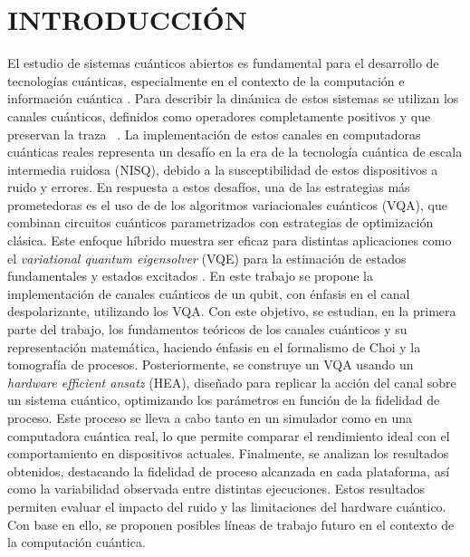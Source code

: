 \documentclass[letterpaper,12pt]{thesisECFM}
\theoremstyle{plain}
\theoremstyle{definition}
\theoremstyle{definition}
\theoremstyle{remark}
\newcommand{\1}{\mathbb{1}}
\begin{document}
\chapter*{INTRODUCCIÓN} %
El estudio de sistemas cuánticos abiertos es fundamental para el desarrollo de
tecnologías cuánticas, especialmente en el contexto de la computación e
información cuántica \cite{nielsen_chuang_2011, schlosshauer2007decoherence}.
Para describir la dinámica de estos sistemas se utilizan los canales cuánticos, definidos como operadores completamente positivos y que preservan la traza  ~\cite{Choi2024}. La implementación de estos canales en computadoras cuánticas reales representa un desafío en la era de la tecnología cuántica de escala intermedia ruidosa (NISQ), debido a la susceptibilidad de estos dispositivos a ruido y errores. 
En respuesta a estos desafíos, una de las estrategias más
prometedoras es el uso de de los algoritmos variacionales cuánticos (VQA),
que combinan circuitos cuánticos parametrizados con estrategias
de optimización clásica. Este enfoque híbrido muestra ser eficaz para
distintas aplicaciones como el \textit{variational quantum eigensolver} (VQE)
para la estimación de estados fundamentales y estados excitados
\cite{VQA}. En este trabajo se propone la implementación de canales
cuánticos de un qubit, con énfasis en el canal despolarizante, utilizando los
VQA. Con este objetivo, se estudian, en la primera parte del trabajo, los
fundamentos teóricos de los canales cuánticos y su representación matemática,
haciendo énfasis en el formalismo de Choi y la tomografía de procesos.
Posteriormente, se construye un VQA usando un \textit{hardware efficient
ansatz} (HEA), diseñado para replicar la acción del canal sobre un sistema
cuántico, optimizando los parámetros en función de la fidelidad de proceso.
Este proceso se lleva a cabo tanto en un simulador como en una computadora
cuántica real, lo que permite comparar el rendimiento ideal con el
comportamiento en dispositivos actuales. Finalmente, se analizan los
resultados obtenidos, destacando la fidelidad de proceso
alcanzada en cada plataforma, así como la variabilidad observada entre
distintas ejecuciones. Estos resultados permiten evaluar el impacto del ruido
y las limitaciones del hardware cuántico. Con base en ello, se proponen
posibles líneas de trabajo futuro en el contexto de la computación cuántica.
\end{document}
